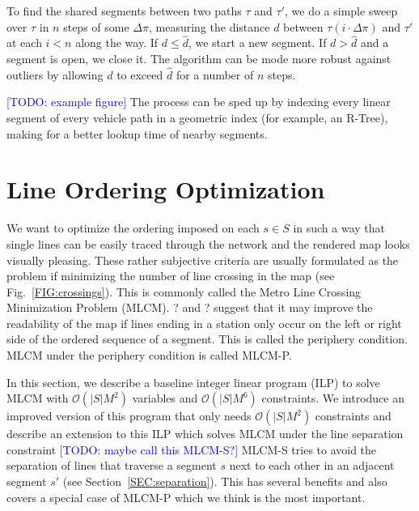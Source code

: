 \documentclass{llncs}
\newcommand\todo[1]{\textcolor{blue}{[TODO: #1]}}
\begin{document}
To find the shared segments between two paths $\tau$ and $\tau'$, we do a simple sweep over $\tau$ in $n$ steps of some $\Delta\pi$, measuring the distance $d$ between $\tau(i\cdot\Delta\pi)$ and $\tau'$ at each $i < n$ along the way. If $d \leq \hat{d}$, we start a new segment. If $d > \hat{d}$ and a segment is open, we close it. The algorithm can be mode more robust against outliers by allowing $d$ to exceed $\hat{d}$ for a number of $n$ steps.

\todo{example figure}
% 
The process can be sped up by indexing every linear segment of every vehicle path in a geometric index (for example, an R-Tree), making for a better lookup time of nearby segments.

%
\section{Line Ordering Optimization}\label{SEC:ordering}
%
We want to optimize the ordering imposed on each $s \in S$ in such a way that single lines can be easily traced through the network and the rendered map looks visually pleasing. These rather subjective criteria are usually formulated as the problem if minimizing the number of line crossing in the map (see Fig.~\ref{FIG:crossings}). This is commonly called the Metro Line Crossing Minimization Problem (MLCM). ? and ? suggest that it may improve the readability of the map if lines ending in a station only occur on the left or right side of the ordered sequence of a segment. This is called the periphery condition. MLCM under the periphery condition is called MLCM-P.

In this section, we describe a baseline integer linear program (ILP) to solve MLCM with $\mathcal{O}(|S|M^{2})$ variables and $\mathcal{O}(|S|M^{6})$ constraints.
We introduce an improved version of this program that only needs $\mathcal{O}(|S|M^2)$ constraints and describe an extension to this ILP which solves MLCM under the line separation constraint \todo{maybe call this MLCM-S?}
MLCM-S tries to avoid the separation of lines that traverse a segment $s$ next to each other in an adjacent segment $s'$ (see Section~\ref{SEC:separation}).
This has several benefits and also covers a special case of MLCM-P which we think is the most important.
\end{document}

